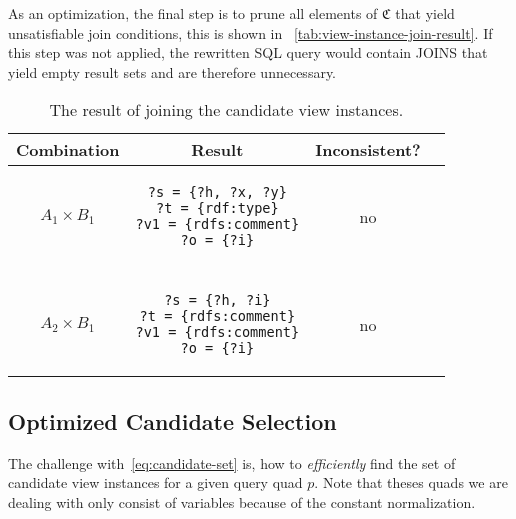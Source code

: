 \documentclass[a4paper,twoside,bibtotoc,abstracton,12pt,BCOR=15mm]{scrreprt}
\begin{document}
As an optimization, the final step is to prune all elements of $\mathfrak{C}$ that yield unsatisfiable join conditions, this is shown in
~\autoref{tab:view-instance-join-result}.
If this step was not applied, the rewritten SQL query would contain JOINS that yield empty result sets and are therefore unnecessary. 

\begin{table}
\centering
\begin{tabular}{cccc}
\toprule
\textbf{Combination} & \textbf{Result} & \textbf{Inconsistent?} \\
\midrule

$A_1 \times B_1$

&

\begin{minipage}{3cm}
\begin{scriptsize}
\begin{verbatim}
?s = {?h, ?x, ?y}
?t = {rdf:type}
?v1 = {rdfs:comment}
?o = {?i}
\end{verbatim}
\end{scriptsize}
\end{minipage}


&

no

\\

\\
 
$A_2 \times B_1$

&

\begin{minipage}{3cm}
\begin{scriptsize}
\begin{verbatim}
?s = {?h, ?i}
?t = {rdfs:comment}
?v1 = {rdfs:comment}
?o = {?i}
\end{verbatim}
\end{scriptsize}
\end{minipage}

&

no

\\
\bottomrule
\end{tabular}
\caption{The result of joining the candidate view instances.}
\label{tab:view-instance-join-result}
\end{table}



\subsection{Optimized Candidate Selection}
\label{sec:optimized-candidate-selection}
The challenge with~\autoref{eq:candidate-set} is, how to \emph{efficiently} find the set of candidate view instances for a given query quad $p$.
Note that theses quads we are dealing with only consist of variables because of the constant normalization.
\end{document}
